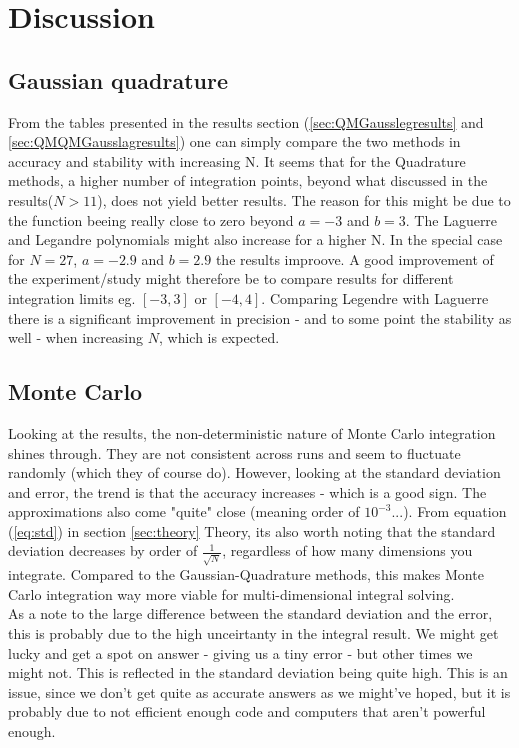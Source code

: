 \documentclass[../main.tex]{subfiles}
\begin{document}
\section{Discussion}
\subsection{Gaussian quadrature}
From the tables presented in the results section (\ref{sec:QMGausslegresults} and \ref{sec:QMQMGausslagresults}) one can simply compare the two methods in accuracy and stability with increasing N. It seems that for the Quadrature methods, a higher number of integration points, beyond what discussed in the results($N>11$), does not yield better results. The reason for this might be due to the function beeing really close to zero beyond $a=-3$ and $b = 3$. The Laguerre and Legandre polynomials might also increase for a higher N. In the special case for $N = 27$, $a = -2.9$ and $b = 2.9$ the results improove. A good improvement of the experiment/study might therefore be to compare results for different integration limits eg. $[-3,3]$ or $[-4,4]$.
Comparing Legendre with Laguerre there is a significant improvement in precision - and to some point the stability as well - when increasing $N$, which is expected.

\subsection{Monte Carlo}
Looking at the results, the non-deterministic nature of Monte Carlo integration shines through. They are not consistent across runs and seem to fluctuate randomly (which they of course do). However, looking at the standard deviation and error, the trend is that the accuracy increases - which is a good sign. The approximations also come "quite" close (meaning order of $10^{-3}$...). From equation (\ref{eq:std}) in section \ref{sec:theory} Theory, its also worth noting that the standard deviation decreases by order of $\frac{1}{\sqrt{N}}$, regardless of how many dimensions you integrate. Compared to the Gaussian-Quadrature methods, this makes Monte Carlo integration way more viable for multi-dimensional integral solving. \\

As a note to the large difference between the standard deviation and the error, this is probably due to the high unceirtanty in the integral result. We might get lucky and get a spot on answer - giving us a tiny error - but other times we might not. This is reflected in the standard deviation being quite high. This is an issue, since we don't get quite as accurate answers as we might've hoped, but it is probably due to not efficient enough code and computers that aren't powerful enough.
\end{document}
